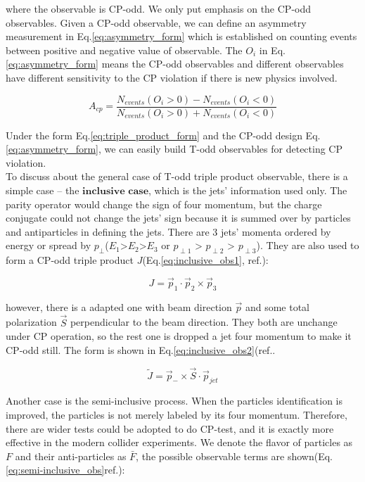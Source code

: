 	where the observable is CP-odd. We only put emphasis on the CP-odd observables. Given a CP-odd observable, we can define an asymmetry measurement in Eq.\ref{eq:asymmetry_form} which is established on counting events between positive and negative value of observable. The $O_i$ in Eq.\ref{eq:asymmetry_form} means the CP-odd observables and different observables have different sensitivity to the CP violation if there is new physics involved.

	\begin{equation}
	A_{cp} = \frac{ N_{events}(O_i>0) - N_{events}(O_i<0) }{ N_{events}(O_i>0) + N_{events}(O_i<0) }
	\label{eq:asymmetry_form}
	\end{equation}

	Under the form Eq.\ref{eq:triple_product_form} and the CP-odd design Eq.\ref{eq:asymmetry_form}, we can easily build T-odd observables for detecting CP violation. \\
	
	To discuss about the general case of T-odd triple product observable, there is a simple case -- the $\textbf{inclusive case}$, which is the jets' information used only. The parity operator would change the sign of four momentum, but the charge conjugate could not change the jets' sign because it is summed over by particles and antiparticles in defining the jets. There are 3 jets' momenta ordered by energy or spread by $p_{\perp}$($E_1$>$E_2$>$E_3$ or $p_{\perp 1}$ > $p_{\perp 2}$ > $p_{\perp 3}$). They are also used to form a CP-odd triple product $J$(Eq.\ref{eq:inclusive_obs1}, ref.\cite{PhysRevLett.58.451}):

	\begin{equation}
	J = \vec{p}_1 \cdot \vec{p}_2 \times \vec{p}_3
	\label{eq:inclusive_obs1}
	\end{equation}

	however, there is a adapted one with beam direction $\vec{p}$ and some total polarization $\vec{S}$ perpendicular to the beam direction. They both are unchange under CP operation, so the rest one is dropped a jet four momentum to make it CP-odd still. The form is shown in Eq.\ref{eq:inclusive_obs2}(ref.\cite{PhysRevLett.58.451}.

	\begin{equation}
	\widetilde{J} = \vec{p}_- \times \vec{S} \cdot \vec{p}_{jet}
	\label{eq:inclusive_obs2}
	\end{equation}

	Another case is the semi-inclusive process. When the particles identification is improved, the particles is not merely labeled by its four momentum. Therefore, there are wider tests could be adopted to do CP-test, and it is exactly more effective in the modern collider experiments. We denote the flavor of particles as $F$ and their anti-particles as $\bar{F}$, the possible observable terms are shown(Eq.\ref{eq:semi-inclusive_obs}ref.\cite{PhysRevLett.58.451}):


